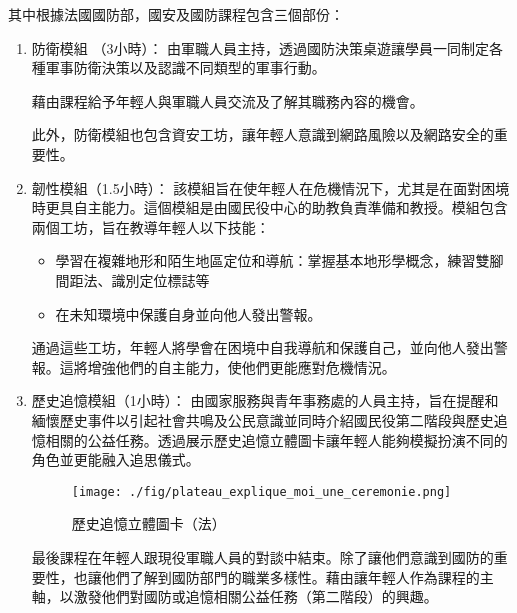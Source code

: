 \documentclass[a4paper,14pt]{extarticle}
\theoremstyle{plain}
\theoremstyle{remark}
\numberwithin{equation}{section}
\begin{document}
其中根據法國國防部\cite{army_snu}，國安及國防課程包含三個部份：
\begin{enumerate}
	\item 防衛模組 （3小時）：
		由軍職人員主持，透過國防決策桌遊讓學員一同制定各種軍事防衛決策以及認識不同類型的軍事行動。

		藉由課程給予年輕人與軍職人員交流及了解其職務內容的機會。

		此外，防衛模組也包含資安工坊，讓年輕人意識到網路風險以及網路安全的重要性。
%
%
	\item 韌性模組（1.5小時）：
    該模組旨在使年輕人在危機情況下，尤其是在面對困境時更具自主能力。這個模組是由國民役中心的助教負責準備和教授。模組包含兩個工坊，旨在教導年輕人以下技能：
%
		\begin{itemize}
			\item 
        學習在複雜地形和陌生地區定位和導航：掌握基本地形學概念，練習雙腳間距法、識別定位標誌等
			\item 在未知環境中保護自身並向他人發出警報。 
		\end{itemize}
	通過這些工坊，年輕人將學會在困境中自我導航和保護自己，並向他人發出警報。這將增強他們的自主能力，使他們更能應對危機情況。	

	\item 歷史追憶模組（1小時）：
		由國家服務與青年事務處的人員主持，旨在提醒和緬懷歷史事件以引起社會共鳴及公民意識並同時介紹國民役第二階段與歷史追憶相關的公益任務。透過展示歷史追憶立體圖卡讓年輕人能夠模擬扮演不同的角色並更能融入追思儀式。
		\begin{figure}[H]
			\centering
		\texttt{[image: ./fig/plateau\_explique\_moi\_une\_ceremonie.png]}
		\caption{歷史追憶立體圖卡（法）}
		\end{figure}
    最後課程在年輕人跟現役軍職人員的對談中結束。除了讓他們意識到國防的重要性，也讓他們了解到國防部門的職業多樣性。藉由讓年輕人作為課程的主軸，以激發他們對國防或追憶相關公益任務（第二階段）的興趣。


\end{enumerate}
\end{document}
